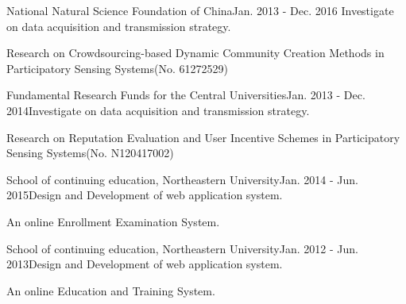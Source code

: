 \documentclass{joel_cv}
\begin{document}
\begin{sectionContentNormal}{National Natural Science Foundation of China}{Jan. 2013 - Dec. 2016}{ Investigate on data acquisition and transmission strategy.}
	\item Research on Crowdsourcing-based Dynamic Community Creation Methods in Participatory Sensing Systems(No. 61272529)
\end{sectionContentNormal}

\begin{sectionContentNormal}{Fundamental Research Funds for the Central Universities}{Jan. 2013 - Dec. 2014}{Investigate on data acquisition and transmission strategy.}
	\item Research on Reputation Evaluation and User Incentive Schemes in Participatory Sensing Systems(No. N120417002)
\end{sectionContentNormal}

\begin{sectionContentNormal}{School of continuing education, Northeastern University}{Jan. 2014 - Jun. 2015}{Design and Development of web application system.}
	\item An online Enrollment Examination System.
\end{sectionContentNormal}

\begin{sectionContentNormal}{School of continuing education, Northeastern University}{Jan. 2012 - Jun. 2013}{Design and Development of web application system.}
	\item An online Education and Training System.
\end{sectionContentNormal}
\end{document}
